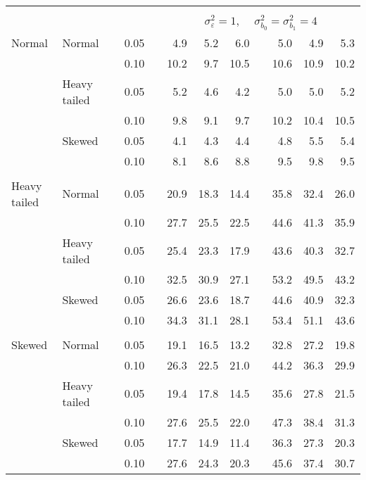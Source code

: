 \begin{table}[ht]
\begin{scriptsize}
\begin{tabular}{ll p{.1cm} c p{.1cm} rrr p{.1cm} rrr}
&&&&&&&&&&&\\
& && && \multicolumn{7}{c}{$\sigma_{\varepsilon}^2 = 1$, \ \ $\sigma_{b_0}^2 = \sigma_{b_1}^2 = 4$} \\ \cline{6-12}
\rowcolor{gray!20} Normal & Normal &  & 0.05 &  & 4.9 & 5.2 & 6.0 &  & 5.0 & 4.9 & 5.3 \\ 
\rowcolor{gray!20}    &  &  & 0.10 &  & 10.2 & 9.7 & 10.5 &  & 10.6 & 10.9 & 10.2 \\ 
\rowcolor{gray!20}    & Heavy tailed &  & 0.05 &  & 5.2 & 4.6 & 4.2 &  & 5.0 & 5.0 & 5.2 \\ 
\rowcolor{gray!20}    &  &  & 0.10 &  & 9.8 & 9.1 & 9.7 &  & 10.2 & 10.4 & 10.5 \\ 
\rowcolor{gray!20}    & Skewed &  & 0.05 &  & 4.1 & 4.3 & 4.4 &  & 4.8 & 5.5 & 5.4 \\ 
\rowcolor{gray!20}    &  &  & 0.10 &  & 8.1 & 8.6 & 8.8 &  & 9.5 & 9.8 & 9.5 \\ 
&&&&&&&&&&&\\
  Heavy tailed & Normal &  & 0.05 &  & 20.9 & 18.3 & 14.4 &  & 35.8 & 32.4 & 26.0 \\ 
   &  &  & 0.10 &  & 27.7 & 25.5 & 22.5 &  & 44.6 & 41.3 & 35.9 \\ 
   & Heavy tailed &  & 0.05 &  & 25.4 & 23.3 & 17.9 &  & 43.6 & 40.3 & 32.7 \\ 
   &  &  & 0.10 &  & 32.5 & 30.9 & 27.1 &  & 53.2 & 49.5 & 43.2 \\ 
   & Skewed &  & 0.05 &  & 26.6 & 23.6 & 18.7 &  & 44.6 & 40.9 & 32.3 \\ 
   &  &  & 0.10 &  & 34.3 & 31.1 & 28.1 &  & 53.4 & 51.1 & 43.6 \\ 
&&&&&&&&&&&\\
  Skewed & Normal &  & 0.05 &  & 19.1 & 16.5 & 13.2 &  & 32.8 & 27.2 & 19.8 \\ 
   &  &  & 0.10 &  & 26.3 & 22.5 & 21.0 &  & 44.2 & 36.3 & 29.9 \\ 
   & Heavy tailed &  & 0.05 &  & 19.4 & 17.8 & 14.5 &  & 35.6 & 27.8 & 21.5 \\ 
   &  &  & 0.10 &  & 27.6 & 25.5 & 22.0 &  & 47.3 & 38.4 & 31.3 \\ 
   & Skewed &  & 0.05 &  & 17.7 & 14.9 & 11.4 &  & 36.3 & 27.3 & 20.3 \\ 
   &  &  & 0.10 &  & 27.6 & 24.3 & 20.3 &  & 45.6 & 37.4 & 30.7 \\ 

\hline
\end{tabular}
\end{scriptsize}
\end{table}




